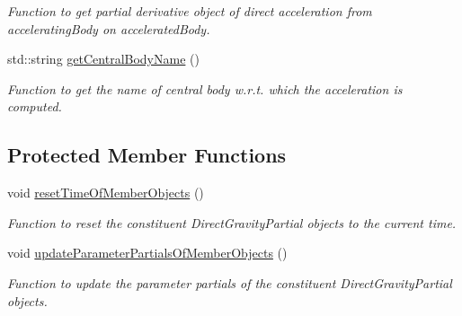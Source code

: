 \begin{DoxyCompactItemize}
\begin{DoxyCompactList}\small\item\em Function to get partial derivative object of direct acceleration from accelerating\+Body on accelerated\+Body. \end{DoxyCompactList}\item 
std\+::string \hyperlink{classtudat_1_1acceleration__partials_1_1ThirdBodyGravityPartial_abbc544d44045d36a2269690802716d8c}{get\+Central\+Body\+Name} ()
\begin{DoxyCompactList}\small\item\em Function to get the name of central body w.\+r.\+t. which the acceleration is computed. \end{DoxyCompactList}\end{DoxyCompactItemize}
\subsection*{Protected Member Functions}
\begin{DoxyCompactItemize}
\item 
void \hyperlink{classtudat_1_1acceleration__partials_1_1ThirdBodyGravityPartial_a8ab2da8408951be11d80b9d75bb4562a}{reset\+Time\+Of\+Member\+Objects} ()\hypertarget{classtudat_1_1acceleration__partials_1_1ThirdBodyGravityPartial_a8ab2da8408951be11d80b9d75bb4562a}{}\label{classtudat_1_1acceleration__partials_1_1ThirdBodyGravityPartial_a8ab2da8408951be11d80b9d75bb4562a}

\begin{DoxyCompactList}\small\item\em Function to reset the constituent Direct\+Gravity\+Partial objects to the current time. \end{DoxyCompactList}\item 
void \hyperlink{classtudat_1_1acceleration__partials_1_1ThirdBodyGravityPartial_a17d59cc4c1186515740736ecd5c74e31}{update\+Parameter\+Partials\+Of\+Member\+Objects} ()\hypertarget{classtudat_1_1acceleration__partials_1_1ThirdBodyGravityPartial_a17d59cc4c1186515740736ecd5c74e31}{}\label{classtudat_1_1acceleration__partials_1_1ThirdBodyGravityPartial_a17d59cc4c1186515740736ecd5c74e31}

\begin{DoxyCompactList}\small\item\em Function to update the parameter partials of the constituent Direct\+Gravity\+Partial objects. \end{DoxyCompactList}\end{DoxyCompactItemize}

